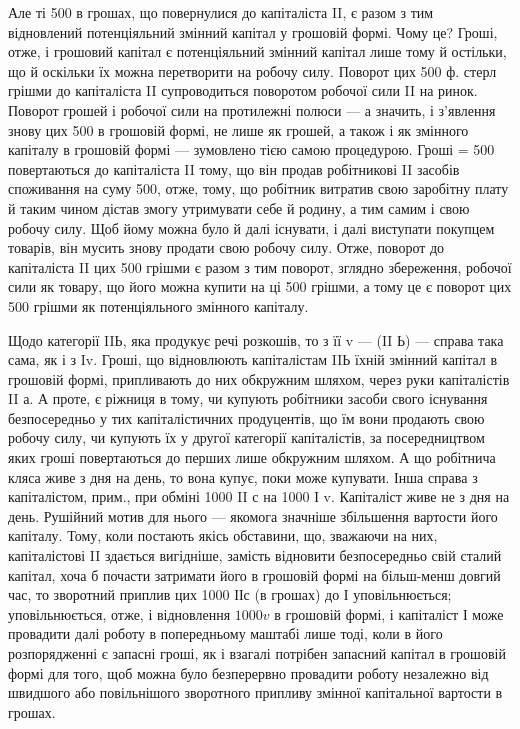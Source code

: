 Але ті 500 в грошах, що повернулися до капіталіста II, є разом з
тим відновлений потенціяльний змінний капітал у грошовій формі. Чому
це? Гроші, отже, і грошовий капітал є потенціяльний змінний капітал
лише тому й остільки, що й оскільки їх можна перетворити на робочу
силу. Поворот цих 500 ф. стерл грішми до капіталіста II супроводиться
поворотом робочої сили II на ринок. Поворот грошей і робочої сили на
протилежні полюси — а значить, і з’явлення знову цих 500 в грошовій
формі, не лише як грошей, а також і як змінного капіталу в грошовій
формі — зумовлено тією самою процедурою. Гроші = 500 повертаються до
капіталіста II тому, що він продав робітникові II засобів споживання на
суму 500, отже, тому, що робітник витратив свою заробітну плату й таким
чином дістав змогу утримувати себе й родину, а тим самим і свою
робочу силу. Щоб йому можна було й далі існувати, і далі виступати
покупцем товарів, він мусить знову продати свою робочу силу. Отже,
поворот до капіталіста II цих 500 грішми є разом з тим поворот, зглядно
збереження, робочої сили як товару, що його можна купити на ці 500
грішми, а тому це є поворот цих 500 грішми як потенціяльного змінного
капіталу.

Щодо категорії IIЬ, яка продукує речі розкошів, то з її v —
(II Ь) — справа така сама, як і з Iv. Гроші, що відновлюють капіталістам
IIЬ їхній змінний капітал в грошовій формі, припливають до них
обкружним шляхом, через руки капіталістів II а. А проте, є ріжниця в
тому, чи купують робітники засоби свого існування безпосередньо у тих
капіталістичних продуцентів, що їм вони продають свою робочу силу, чи
купують їх у другої категорії капіталістів, за посередництвом яких гроші
повертаються до перших лише обкружним шляхом. А що робітнича кляса
живе з дня на день, то вона купує, поки може купувати. Інша справа
з капіталістом, прим., при обміні 1000 II с на 1000 І v. Капіталіст живе
не з дня на день. Рушійний мотив для нього — якомога значніше збільшення
вартости його капіталу. Тому, коли постають якісь обставини, що,
зважаючи на них, капіталістові II здається вигідніше, замість відновити
безпосередньо свій сталий капітал, хоча б почасти затримати його в
грошовій формі на більш-менш довгий час, то зворотний приплив цих
1000 ІІс (в грошах) до І уповільнюється; уповільнюється, отже, і відновлення
$1000 v$ в грошовій формі, і капіталіст І може провадити далі
роботу в попередньому маштабі лише тоді, коли в його розпорядженні
є запасні гроші, як і взагалі потрібен запасний капітал в грошовій формі
для того, щоб можна було безперервно провадити роботу незалежно від
швидшого або повільнішого зворотного припливу змінної капітальної вартости
в грошах.

